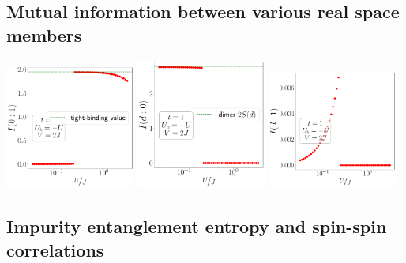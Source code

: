 \documentclass{report}
\numberwithin{equation}{section}
\begin{document}
\subsection*{Mutual information between various real space members}
\begin{center}
	\includegraphics[width=0.32\textwidth]{../figures/mi-01-t=1.000,J=31.623,0.000,50,V=2J,Ubath=-U,N=4,U=0.032,3.162,50.pdf}
	\includegraphics[width=0.32\textwidth]{../figures/mi-d0-t=1.000,J=31.623,0.000,50,V=2J,Ubath=-U,N=4,U=0.032,3.162,50.pdf}
	\includegraphics[width=0.32\textwidth]{../figures/mi-d1-t=1.000,J=31.623,0.000,50,V=2J,Ubath=-U,N=4,U=0.032,3.162,50.pdf}
\end{center}

\subsection*{Impurity entanglement entropy and spin-spin correlations}
\end{document}
